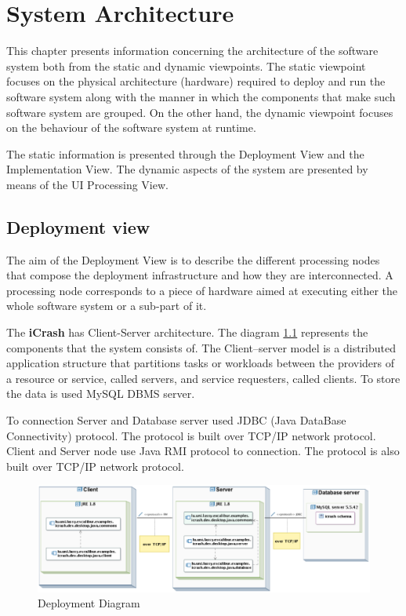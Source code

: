 \chapter{System Architecture}
\label{chap:arch}

This chapter presents information concerning the architecture of the software
system both from the static and dynamic viewpoints. The static viewpoint focuses
on the physical architecture (hardware) required to deploy and run the
software system along with the manner in which the components that make such
software system are grouped. On the other hand, the dynamic viewpoint focuses on
the behaviour of the software system at runtime. 

The static information is presented through the \gls{Deployment View} and the
\gls{Implementation View}. The dynamic aspects of the system are presented by
means of the \gls{UI Processing View}.


\section{Deployment view}
The aim of the \gls{Deployment View} is to describe the different processing nodes that compose
the deployment infrastructure and how they are interconnected. A processing node
corresponds to a piece of hardware aimed at executing either the whole software
system or a sub-part of it.

The \textbf{iCrash} has Client-Server architecture.
The diagram \ref{fig:deploy-diagram} represents the components that the
system consists of.
The Client–server model is a distributed application structure that partitions
tasks or workloads between the providers of a resource or service, 
called servers, and service requesters, called clients. To store the data is
used MySQL DBMS server.

To connection Server and Database server used JDBC (Java
DataBase Connectivity) protocol. The protocol is built over TCP/IP network
protocol.
Client and Server node use Java RMI protocol to connection. The
protocol is also built over TCP/IP network protocol.  

\begin{figure}[H]
	\begin{center}
	  \includegraphics[width=450px]{images/architecture/deployment-view/deployment_view.eps}
	  \caption{Deployment Diagram}
	  \label{fig:deploy-diagram}
	\end{center}
\end{figure}



